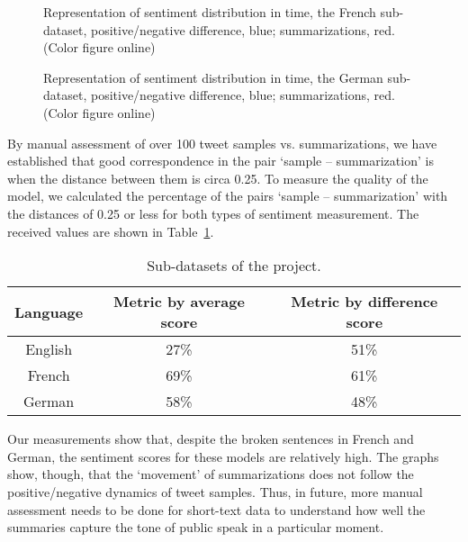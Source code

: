 \begin{figure}[ht]
	\caption{Representation of sentiment distribution in time, the French sub-dataset, positive/negative difference, blue; summarizations, red. (Color figure online)}\label{fig:frenchPosNegDiff}
\end{figure}

\begin{figure}[ht]
	\caption{Representation of sentiment distribution in time, the German sub-dataset, positive/negative difference, blue; summarizations, red. (Color figure online)}\label{fig:germanPosNegDiff}
\end{figure}

By manual assessment of over 100 tweet samples vs. summarizations, we have established that good correspondence in the pair ‘sample -- summarization’ is when the distance between them is circa 0.25. To measure the quality of the model, we calculated the percentage of the pairs ‘sample -- summarization’ with the distances of 0.25 or less for both types of sentiment measurement. The received values are shown in Table~\cref{tab:modelQualityMeasurements}.

\begin{table}[ht]%
	\centering
	\caption{Sub-datasets of the project.}%
	\label{tab:modelQualityMeasurements}%
		\small
		\begin{tabular}{ c  c  c }%
			\toprule     %
			Language & Metric by average score & Metric by difference score \\
			\midrule %
			English & 27\% & 51\%\\
			French & 69\% & 61\%\\
			German & 58\% & 48\% \\
			\bottomrule %
		\end{tabular}%
\end{table}

Our measurements show that, despite the broken sentences in French and German, the sentiment scores for these models are relatively high. The graphs show, though, that the ‘movement’ of summarizations does not follow the positive/negative dynamics of tweet samples. Thus, in future, more manual assessment needs to be done for short-text data to understand how well the summaries capture the tone of public speak in a particular moment.

